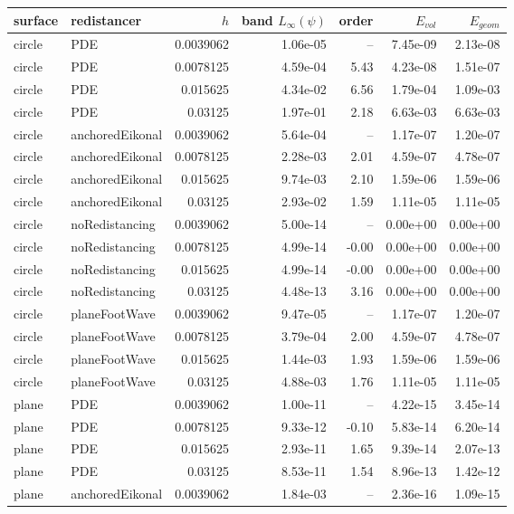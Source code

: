 \begin{tabular}{l l r r r r r}
\hline
surface & redistancer & $h$ & band $L_\infty(\psi)$ & order & $E_{vol}$ & $E_{geom}$ \\
\hline
circle & PDE & 0.0039062 & 1.06e-05 & -- & 7.45e-09 & 2.13e-08 \\
circle & PDE & 0.0078125 & 4.59e-04 & 5.43 & 4.23e-08 & 1.51e-07 \\
circle & PDE & 0.015625 & 4.34e-02 & 6.56 & 1.79e-04 & 1.09e-03 \\
circle & PDE & 0.03125 & 1.97e-01 & 2.18 & 6.63e-03 & 6.63e-03 \\
\hline
circle & anchoredEikonal & 0.0039062 & 5.64e-04 & -- & 1.17e-07 & 1.20e-07 \\
circle & anchoredEikonal & 0.0078125 & 2.28e-03 & 2.01 & 4.59e-07 & 4.78e-07 \\
circle & anchoredEikonal & 0.015625 & 9.74e-03 & 2.10 & 1.59e-06 & 1.59e-06 \\
circle & anchoredEikonal & 0.03125 & 2.93e-02 & 1.59 & 1.11e-05 & 1.11e-05 \\
\hline
circle & noRedistancing & 0.0039062 & 5.00e-14 & -- & 0.00e+00 & 0.00e+00 \\
circle & noRedistancing & 0.0078125 & 4.99e-14 & -0.00 & 0.00e+00 & 0.00e+00 \\
circle & noRedistancing & 0.015625 & 4.99e-14 & -0.00 & 0.00e+00 & 0.00e+00 \\
circle & noRedistancing & 0.03125 & 4.48e-13 & 3.16 & 0.00e+00 & 0.00e+00 \\
\hline
circle & planeFootWave & 0.0039062 & 9.47e-05 & -- & 1.17e-07 & 1.20e-07 \\
circle & planeFootWave & 0.0078125 & 3.79e-04 & 2.00 & 4.59e-07 & 4.78e-07 \\
circle & planeFootWave & 0.015625 & 1.44e-03 & 1.93 & 1.59e-06 & 1.59e-06 \\
circle & planeFootWave & 0.03125 & 4.88e-03 & 1.76 & 1.11e-05 & 1.11e-05 \\
\hline
plane & PDE & 0.0039062 & 1.00e-11 & -- & 4.22e-15 & 3.45e-14 \\
plane & PDE & 0.0078125 & 9.33e-12 & -0.10 & 5.83e-14 & 6.20e-14 \\
plane & PDE & 0.015625 & 2.93e-11 & 1.65 & 9.39e-14 & 2.07e-13 \\
plane & PDE & 0.03125 & 8.53e-11 & 1.54 & 8.96e-13 & 1.42e-12 \\
\hline
plane & anchoredEikonal & 0.0039062 & 1.84e-03 & -- & 2.36e-16 & 1.09e-15 \\

\end{tabular}
